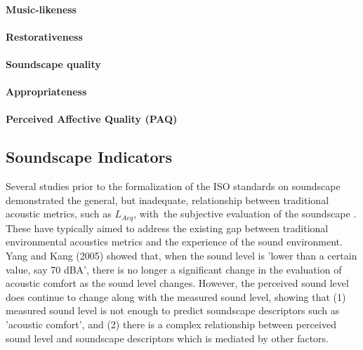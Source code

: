 \paragraph{Music-likeness}

\paragraph{Restorativeness}

\paragraph{Soundscape quality}

\paragraph{Appropriateness}

\paragraph{Perceived Affective Quality (PAQ)}

\subsection{Soundscape Indicators}
Several studies prior to the formalization of the ISO standards on soundscape demonstrated the general, but inadequate, relationship between traditional acoustic metrics, such as $L_{Aeq}$, with~the subjective evaluation of the soundscape \citep{Berglund2006Tool,Yang2005Acoustic,Rychtarikova2013Soundscape,Aumond2017Modeling,AlsinaPages2021Perceptual}. These have typically aimed to address the existing gap between traditional environmental acoustics metrics and the experience of the sound environment. Yang and Kang (2005) showed that, when the sound level is 'lower than a certain value, say 70 dBA', there is no longer a significant change in the evaluation of acoustic comfort as the sound level changes. However, the perceived sound level does continue to change along with the measured sound level, showing that (1) measured sound level is not enough to predict soundscape descriptors such as 'acoustic comfort', and (2) there is a complex relationship between perceived sound level and soundscape descriptors which is mediated by other factors.

